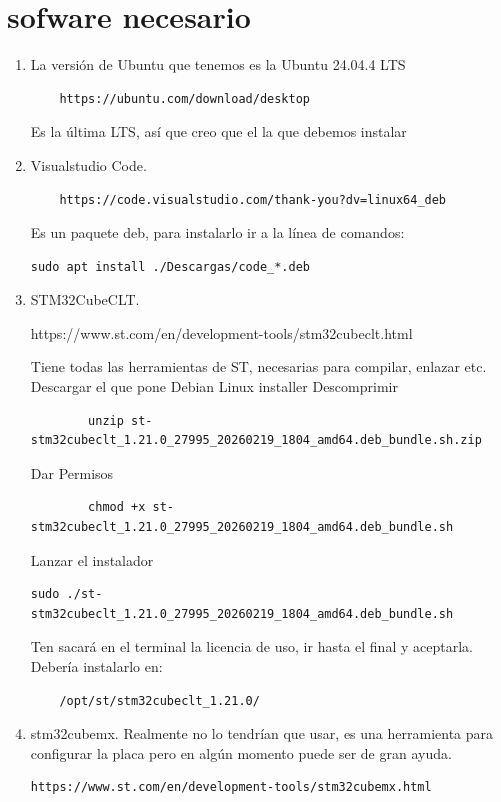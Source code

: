 \documentclass[10pt,a4paper]{report}
\begin{document}
\section{sofware necesario}

\begin{enumerate}
	\item La versión de Ubuntu que tenemos es la Ubuntu 24.04.4 LTS
	\begin{verbatim}
	https://ubuntu.com/download/desktop
	\end{verbatim}
	Es la última LTS, así que creo que el la que debemos instalar
	\item Visualstudio Code.
	\begin{verbatim}
	https://code.visualstudio.com/thank-you?dv=linux64_deb
	\end{verbatim}
Es un paquete deb, para instalarlo ir a la línea de comandos:
\begin{verbatim}
sudo apt install ./Descargas/code_*.deb	
\end{verbatim}

	
	\item STM32CubeCLT.
	
	https://www.st.com/en/development-tools/stm32cubeclt.html

	Tiene todas las herramientas de ST, necesarias para compilar, enlazar etc.
	Descargar el que pone Debian Linux installer
	Descomprimir
	\begin{verbatim}
		unzip st-stm32cubeclt_1.21.0_27995_20260219_1804_amd64.deb_bundle.sh.zip
	\end{verbatim}
	Dar Permisos
	\begin{verbatim}
		chmod +x st-stm32cubeclt_1.21.0_27995_20260219_1804_amd64.deb_bundle.sh
	\end{verbatim}
Lanzar el instalador
\begin{verbatim}
sudo ./st-stm32cubeclt_1.21.0_27995_20260219_1804_amd64.deb_bundle.sh	
\end{verbatim}
Ten sacará en el terminal la licencia de uso, ir hasta el final y aceptarla.
Debería instalarlo en:
\begin{verbatim}
	/opt/st/stm32cubeclt_1.21.0/
\end{verbatim}

\item stm32cubemx. Realmente no lo tendrían que usar, es una herramienta para configurar la placa pero en algún momento puede ser de gran ayuda.
\begin{verbatim}
https://www.st.com/en/development-tools/stm32cubemx.html
\end{verbatim}


\end{enumerate}
\end{document}
